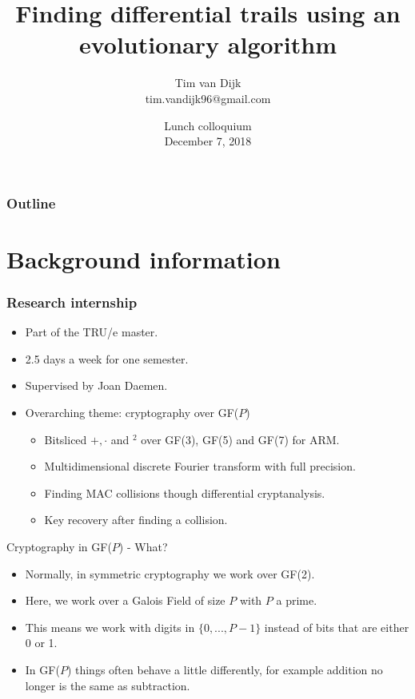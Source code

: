 \documentclass{beamer}
\title[Finding differential trails using an evolutionary algorithm]{
Finding differential trails using an evolutionary algorithm}
\author[Tim van Dijk]{Tim van Dijk\texorpdfstring{\\ tim.vandijk96@gmail.com}{}}
\institute[Radboud University Nijmegen]{
  Institute for Computing and Information Sciences -- Digital Security \\
  Radboud University Nijmegen}
\date[Lunch colloquium 7 dec 2018]{
  Lunch colloquium \\
  December 7, 2018}
\begin{document}
\begin{frame}[plain]
  \titlepage
\end{frame}

\begin{frame}
  \frametitle{Outline}
  \tableofcontents
\end{frame}

\section{Background information}
\begin{frame}
\frametitle{Research internship}
\begin{itemize}
    \item Part of the TRU/e master.
    \item 2.5 days a week for one semester.
    \item Supervised by Joan Daemen.
    \item Overarching theme: cryptography over GF($P$)
    \begin{itemize}
        \item Bitsliced $+, \cdot$ and $^2$ over GF(3), GF(5) and GF(7) for ARM.
        \item Multidimensional discrete Fourier transform with full precision.
        \item Finding MAC collisions though differential cryptanalysis.
        \item Key recovery after finding a collision.
    \end{itemize}
\end{itemize}
\end{frame}

\begin{frame}{Cryptography in GF($P$) - What?}
\begin{itemize}
    \item Normally, in symmetric cryptography we work over GF(2).
    \item Here, we work over a Galois Field of size $P$ with $P$ a prime.
    \item This means we work with digits in $\{0, ..., P-1\}$ instead of bits that are either 0 or 1.
    \item In GF($P$) things often behave a little differently, for example addition no longer is the same as subtraction.
\end{itemize}
\end{frame}
\end{document}
